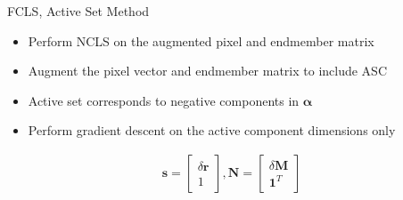 \documentclass{beamer}
\begin{document}
\begin{frame}{FCLS, Active Set Method}
\begin{itemize}
\item Perform NCLS on the augmented pixel and endmember matrix
\item Augment the pixel vector and endmember matrix to include ASC
\item Active set corresponds to negative components in \(\mathbf{\alpha}\)
\item Perform gradient descent on the active component dimensions only
\end{itemize}

\begin{align*}
\mathbf{s} = \begin{bmatrix}
\delta\mathbf{r} \\ 1
\end{bmatrix},
\mathbf{N} = \begin{bmatrix}
\delta \mathbf{M} \\ \mathbf{1}^T
\end{bmatrix}
\end{align*}
\end{frame}
\end{document}
